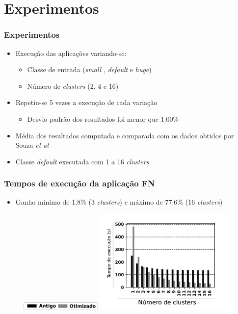 \documentclass[xcolor={table}]{beamer}
\begin{document}
\section{Experimentos}
\begin{frame}\frametitle{Experimentos}
	\begin{itemize}
		\item{Execução das aplicações variando-se:}
		\begin{itemize}
			\item Classe de entrada (\textit{small} , \textit{default} e \textit{huge})
			\item Número de \textit{clusters} (2, 4 e 16)
		\end{itemize}
		\item Repetiu-se 5 vezes a execução de cada variação 
		\begin{itemize}
		\item Desvio padrão dos resultados foi menor que 1.00\%		
		\end{itemize}
		\item Média dos resultados computada e comparada com os dados obtidos por Souza \textit{et al} \cite{Castro-Souza-CCPE:2016}
		\item Classe \textit{default} executada com 1 a 16 \textit{clusters}.
	\end{itemize}
\end{frame}

\begin{frame}\frametitle{Tempos de execução da aplicação FN}
\begin{itemize}
\item Ganho mínimo de 1.8\% (3 \textit{clusters}) e máximo de 77.6\% (16 \textit{clusters})
\end{itemize}
\begin{figure}
    \centering
    \includegraphics[width=4cm, keepaspectratio]{figs/legend.pdf}
    \includegraphics[width=7cm, keepaspectratio]{figs/fntime.pdf}
    \label{fig:fig7}
\end{figure}
\end{frame}
\end{document}
